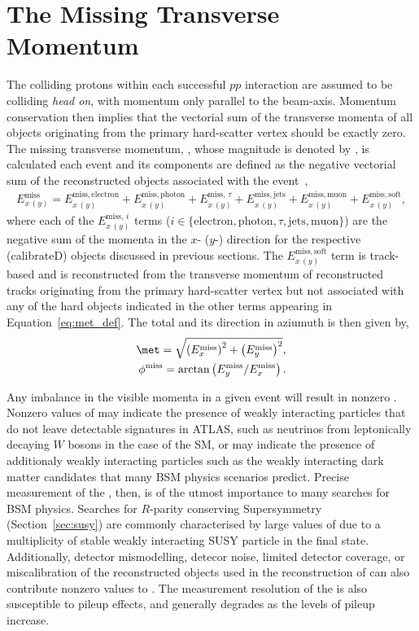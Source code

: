 \section{The Missing Transverse Momentum}
\label{sec:met}

The colliding protons within each successful $pp$ interaction are assumed to be colliding
\textit{head on}, with momentum only parallel to the beam-axis.
Momentum conservation then implies that the vectorial sum of the transverse momenta of all objects
originating from the primary hard-scatter vertex should be exactly zero.
The missing transverse momentum, \ptmiss, whose magnitude is denoted by \met, is calculated
each event and its components are defined as the negative vectorial sum of the
reconstructed objects associated with the event~\cite{METPaper},
\begin{align}
    E_{x\,(y)}^{\text{miss}} = E_{x\,(y)}^{\text{miss},\,\text{electron}} + E_{x\,(y)}^{\text{miss},\,\text{photon}} + E_{x\,(y)}^{\text{miss},\,\tau} + E_{x\,(y)}^{\text{miss},\,\text{jets}} + E_{x\,(y)}^{\text{miss},\,\text{muon}} + E_{x\,(y)}^{\text{miss},\,\text{soft}},
    \label{eq:met_def}
\end{align}
where each of the $E_{x\,(y)}^{\text{miss},\,i}$ terms ($i \in \{ \text{electron}, \text{photon}, \tau, \text{jets}, \text{muon} \}$)
are the negative sum of the momenta in the $x$- ($y$-) direction for the respective (calibrateD) objects discussed in previous sections.
The $E_{x\,(y)}^{\text{miss},\,\text{soft}}$ term is track-based and is reconstructed from the transverse momentum of 
reconstructed tracks originating from the primary hard-scatter vertex but not associated with any of the
hard objects indicated in the other terms appearing in Equation~\ref{eq:met_def}.
The total \met and its direction in aziumuth is then given by,
\begin{align}
    \met = \sqrt{ \left(E_x^{\text{miss}} \right)^2 + \left( E_y^{\text{miss}} \right)^2 }, \\
    \phi^{\text{miss}} = \arctan \left( E_y^{\text{miss}} / E_x^{\text{miss}} \right).
\end{align}

Any imbalance in the visible momenta in a given event will result in nonzero \met.
Nonzero values of \met may indicate the presence of weakly interacting particles that do not leave
detectable signatures in ATLAS, such as neutrinos from leptonically decaying $W$ bosons
in the case of the SM, or may indicate the presence of additionaly weakly interacting particles
such as the weakly interacting dark matter candidates that many BSM physics scenarios predict.
Precise measurement of the \met, then, is of the utmost importance to many searches for BSM physics.
Searches for $R$-parity conserving Supersymmetry (Section~\ref{sec:susy}) are commonly characterised
by large values of \met due to a multiplicity of stable weakly interacting SUSY particle in the final state.
Additionally, detector mismodelling, detecor noise, limited detector coverage, or miscalibration of the reconstructed objects used in the reconstruction
of \ptmiss can also contribute nonzero values to \met.
The measurement resolution of the \met is also susceptible to pileup effects, and generally
degrades as the levels of pileup increase.
